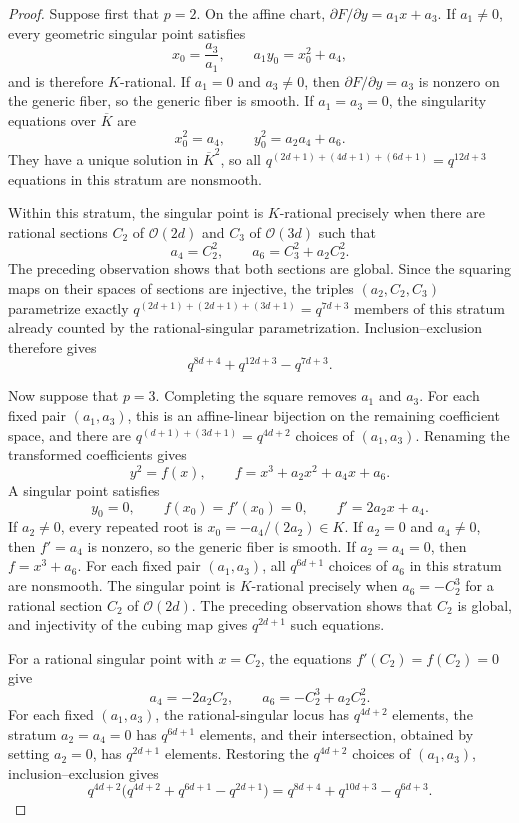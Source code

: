\documentclass[a4paper,12pt]{amsart}
\theoremstyle{definition}
\begin{document}
\begin{proof}
Suppose first that $p=2$.  On the affine chart, $\partial F/\partial y=a_1x+a_3$.  If $a_1\neq0$, every geometric singular point satisfies
\[
x_0=\frac{a_3}{a_1},
\qquad
a_1y_0=x_0^2+a_4,
\]
and is therefore $K$-rational.  If $a_1=0$ and $a_3\neq0$, then $\partial F/\partial y=a_3$ is nonzero on the generic fiber, so the generic fiber is smooth.  If $a_1=a_3=0$, the singularity equations over $\overline K$ are
\[
x_0^2=a_4,
\qquad
y_0^2=a_2a_4+a_6.
\]
They have a unique solution in $\overline K^2$, so all $q^{(2d+1)+(4d+1)+(6d+1)}=q^{12d+3}$ equations in this stratum are nonsmooth.

Within this stratum, the singular point is $K$-rational precisely when there are rational sections $C_2$ of $\mathcal O(2d)$ and $C_3$ of $\mathcal O(3d)$ such that
\[
a_4=C_2^2,
\qquad
a_6=C_3^2+a_2C_2^2.
\]
The preceding observation shows that both sections are global.  Since the squaring maps on their spaces of sections are injective, the triples $(a_2,C_2,C_3)$ parametrize exactly $q^{(2d+1)+(2d+1)+(3d+1)}=q^{7d+3}$ members of this stratum already counted by the rational-singular parametrization.  Inclusion--exclusion therefore gives
\[
q^{8d+4}+q^{12d+3}-q^{7d+3}.
\]

Now suppose that $p=3$.  Completing the square removes $a_1$ and $a_3$. For each fixed pair $(a_1,a_3)$, this is an affine-linear bijection on the remaining coefficient space, and there are $q^{(d+1)+(3d+1)}=q^{4d+2}$ choices of $(a_1,a_3)$.  Renaming the transformed coefficients gives
\[
y^2=f(x),
\qquad
f=x^3+a_2x^2+a_4x+a_6.
\]
A singular point satisfies
\[
y_0=0,
\qquad
f(x_0)=f'(x_0)=0,
\qquad
f'=2a_2x+a_4.
\]
If $a_2\neq0$, every repeated root is $x_0=-a_4/(2a_2)\in K$.  If $a_2=0$ and $a_4\neq0$, then $f'=a_4$ is nonzero, so the generic fiber is smooth.  If $a_2=a_4=0$, then $f=x^3+a_6$.  For each fixed pair $(a_1,a_3)$, all $q^{6d+1}$ choices of $a_6$ in this stratum are nonsmooth.  The singular point is $K$-rational precisely when $a_6=-C_2^3$ for a rational section $C_2$ of $\mathcal O(2d)$.  The preceding observation shows that $C_2$ is global, and injectivity of the cubing map gives $q^{2d+1}$ such equations.

For a rational singular point with $x=C_2$, the equations $f'(C_2)=f(C_2)=0$ give
\[
a_4=-2a_2C_2,
\qquad
a_6=-C_2^3+a_2C_2^2.
\]
For each fixed $(a_1,a_3)$, the rational-singular locus has $q^{4d+2}$ elements, the stratum $a_2=a_4=0$ has $q^{6d+1}$ elements, and their intersection, obtained by setting $a_2=0$, has $q^{2d+1}$ elements. Restoring the $q^{4d+2}$ choices of $(a_1,a_3)$, inclusion--exclusion gives
\[
q^{4d+2}
\bigl(q^{4d+2}+q^{6d+1}-q^{2d+1}\bigr)
=q^{8d+4}+q^{10d+3}-q^{6d+3}.
\]


\end{proof}
\end{document}

